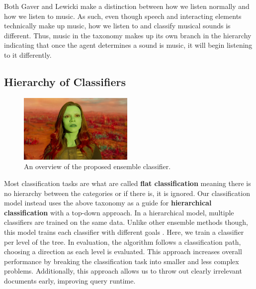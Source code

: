 Both Gaver and Lewicki make a distinction between how we listen normally and how
we listen to music. As such, even though speech and interacting elements
technically make up music, how we listen to and classify musical sounds is
different. Thus, music in the taxonomy makes up its own branch in the hierarchy
indicating that once the agent determines a sound is music, it will begin
listening to it differently.

\subsection{Hierarchy of Classifiers}



\begin{figure}[h!]
    \centering
    \includegraphics[width=0.49\textwidth]{figures/classifier-hierarchy.jpg}
    \caption{An overview of the proposed ensemble classifier.}
    \label{fig:classifier-hierarchy}
\end{figure}

Most classification tasks are what are called \textbf{flat classification}
meaning there is no hierarchy between the categories or if there is, it is
ignored. Our classification model instead uses the above taxonomy as a guide for \textbf{hierarchical classification} with a top-down approach. In a hierarchical model, multiple classifiers are trained on the same data. Unlike other ensemble methods though, this model trains each classifier with different goals \cite{chou-hierarchical-2003}. Here, we train a classifier per level of the tree. In evaluation, the algorithm follows a classification path, choosing a direction as each level is evaluated. This approach increases overall performance by breaking the classification task into smaller and less complex problems. Additionally, this approach allows us to throw out clearly irrelevant documents early, improving query runtime.

